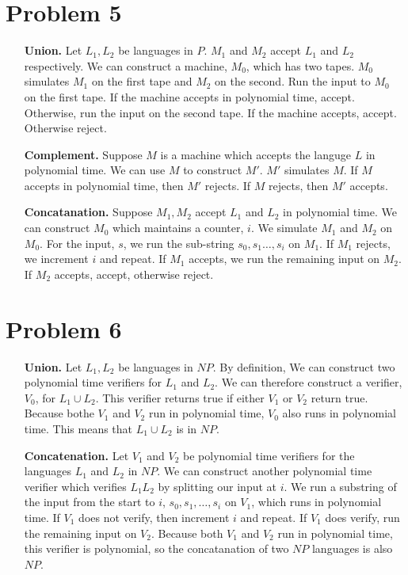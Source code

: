 \documentclass{article}
\newenvironment{problem}[1]{
  \nobreak\section*{Problem #1}
}{}
\begin{document}
  \begin{problem}{5}
    \begin{enumerate}
      \item [\textbf{Union.}] Let $L_1, L_2$ be languages in $P$. $M_1$ and $M_2$
      accept $L_1$ and $L_2$ respectively.  We can construct a machine, $M_0$,
      which has two tapes.  $M_0$ simulates $M_1$ on the first tape and $M_2$ on
      the second.  Run the input to $M_0$ on the first tape.  If the machine
      accepts in polynomial time, accept.  Otherwise, run the input on the second
      tape.  If the machine accepts, accept.  Otherwise reject.

      \item [\textbf{Complement.}] Suppose $M$ is a machine which accepts the
      languge $L$ in polynomial time.  We can use $M$ to construct $M'$.  $M'$
      simulates $M$.  If $M$ accepts in polynomial time, then $M'$ rejects.  If
      $M$ rejects, then $M'$ accepts.
      
      \item [\textbf{Concatanation.}] Suppose $M_1, M_2$ accept $L_1$ and $L_2$
      in polynomial time.  We can construct $M_0$ which maintains a counter, $i$.
      We simulate $M_1$ and $M_2$ on $M_0$.  For the input, $s$, we run the
      sub-string $s_0, s_1 \dotsc, s_i$ on $M_1$.  If $M_1$ rejects, we increment
      $i$ and repeat.  If $M_1$ accepts, we run the remaining input on $M_2$.
      If $M_2$ accepts, accept, otherwise reject.
    \end{enumerate}
  \end{problem}

  \begin{problem}{6}
    \begin{enumerate}
      \item [\textbf{Union.}] Let $L_1, L_2$ be languages in $NP$.  By definition,
      We can construct two polynomial time verifiers for $L_1$ and $L_2$.  We can
      therefore construct a verifier, $V_0$, for $L_1 \cup L_2$.  This verifier
      returns true if either $V_1$ or $V_2$ return true.  Because bothe $V_1$ and
      $V_2$ run in polynomial time, $V_0$ also runs in polynomial time.  This means
      that $L_1 \cup L_2$ is in $NP$.

      \item [\textbf{Concatenation.}] Let $V_1$ and $V_2$ be polynomial time
      verifiers for the languages $L_1$ and $L_2$ in $NP$. We can construct
      another polynomial time verifier which verifies $L_1L_2$ by splitting
      our input at $i$.  We run a substring of the input from the start to $i$,
      $s_0, s_1, \dotsc, s_i$ on $V_1$, which runs in polynomial time.  If $V_1$
      does not verify, then increment $i$ and repeat.  If $V_1$ does verify, run
      the remaining input on $V_2$.  Because both $V_1$ and $V_2$ run in polynomial
      time, this verifier is polynomial, so the concatanation of two $NP$ languages
      is also $NP$.
    \end{enumerate}
  \end{problem}
\end{document}
